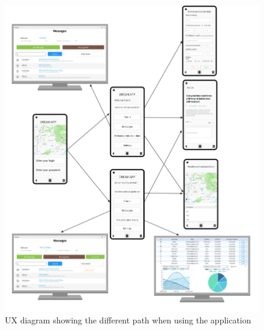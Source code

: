 \begin{figure}[H]
	
	\centering
	
	\includegraphics[width=\columnwidth]{Images/ux_diag.png}
	
	\caption{UX diagram showing the different path when using the application}
	
	\label{Fig:diag_ux}
	
\end{figure}
